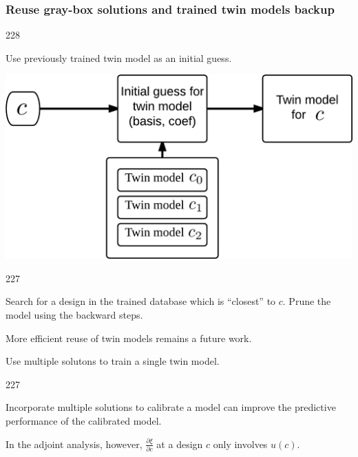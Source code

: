 \documentclass{beamer}
\let\oldcite=\cite
\renewcommand{\cite}[1]{\textcolor[rgb]{.4,.4,.85}{\oldcite{#1}}}
\newcommand{\barrow}{\item[\color{darkred}\ding{228}]}
\newcommand{\carrow}{\item[\color{darkred}\ding{227}]}
\begin{document}
\begin{frame}
    \frametitle{Reuse gray-box solutions and trained twin models \hfill \scriptsize{backup}}\small
    \begin{dinglist}{228}
        \barrow Use previously trained twin model as an initial guess.\\
        \begin{center}
            \includegraphics[width=6.cm]{reuse_twin_model.png}
        \end{center}
        \begin{dinglist}{227}
            \carrow Search for a design in the trained database which is ``closest'' to $c$.
                    Prune the model using the backward steps.
            \carrow More efficient reuse of twin models remains a future work.
        \end{dinglist}
        
        \barrow Use multiple solutons to train a single twin model.\\
        \begin{dinglist}{227}
            \carrow Incorporate multiple solutions to calibrate a model can improve 
                    the predictive performance of the calibrated model.
                    \scriptsize \cite{Arendt 12}\small
            \carrow In the adjoint analysis, however, $\frac{\partial \xi}{\partial c}$ 
                    at a design $c$ only involves $u(c)$.
        \end{dinglist}
    \end{dinglist}

\end{frame}
\end{document}

